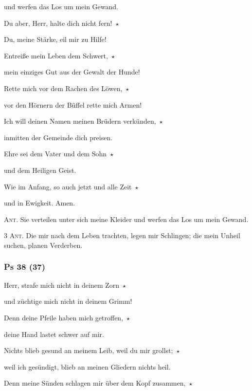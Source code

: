 und werfen das Los um mein Gewand.
 
\noindent Du aber, Herr, halte dich nicht fern!~$\star$~\nopagebreak

Du, meine Stärke, eil mir zu Hilfe!
 
\noindent Entreiße mein Leben dem Schwert,~$\star$~\nopagebreak

mein einziges Gut aus der Gewalt der Hunde!
 
\noindent Rette mich vor dem Rachen des Löwen,~$\star$~\nopagebreak

vor den Hörnern der Büffel rette mich Armen!
 
\noindent Ich will deinen Namen meinen Brüdern verkünden,~$\star$~\nopagebreak

inmitten der Gemeinde dich preisen.

\noindent Ehre sei dem Vater und dem Sohn~$\star$~\nopagebreak

und dem Heiligen Geist.

\noindent Wie im Anfang, so auch jetzt und alle Zeit~$\star$~\nopagebreak

und in Ewigkeit. Amen.

\vspace{10pt}

\noindent \textsc{Ant.} Sie verteilen unter sich meine Kleider und werfen das Los um mein Gewand.

\vspace{10pt}

\noindent \textsc{3 Ant.} Die mir nach dem Leben trachten, legen mir Schlingen; die mein Unheil suchen, planen Verderben.

\subsubsection{Ps 38 (37)}

\noindent Herr, strafe mich nicht in deinem Zorn~$\star$~\nopagebreak

und züchtige mich nicht in deinem Grimm!
 
\noindent Denn deine Pfeile haben mich getroffen,~$\star$~\nopagebreak

deine Hand lastet schwer auf mir.
 
\noindent Nichts blieb gesund an meinem Leib, weil du mir grollst;~$\star$~\nopagebreak

weil ich gesündigt, blieb an meinen Gliedern nichts heil.
 
\noindent Denn meine Sünden schlagen mir über dem Kopf zusammen,~$\star$~\nopagebreak

